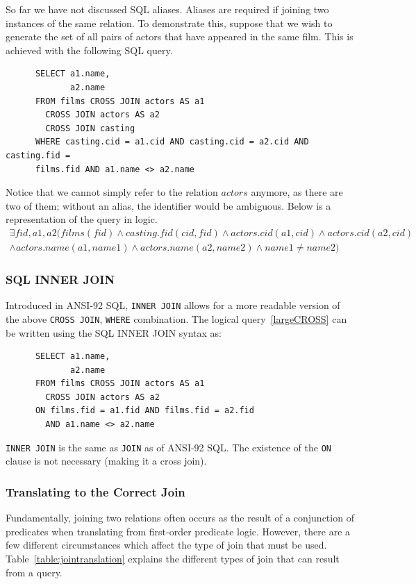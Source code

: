 \documentclass[a4paper, 11pt]{article}
\begin{document}
      So far we have not discussed SQL aliases. Aliases are required if joining
      two instances of the same relation. To demonstrate this, suppose that we
      wish to generate the set of all pairs of actors that have appeared in the
      same film. This is achieved with the following SQL query.
      \begin{verbatim}
      SELECT a1.name,
             a2.name
      FROM films CROSS JOIN actors AS a1
        CROSS JOIN actors AS a2
        CROSS JOIN casting
      WHERE casting.cid = a1.cid AND casting.cid = a2.cid AND casting.fid =
      films.fid AND a1.name <> a2.name
      \end{verbatim}
      Notice that we cannot simply refer to the relation $actors$ anymore, as
      there are two of them; without an alias, the identifier would be
      ambiguous. Below is a representation of the query in logic.
      \begin{multline}
        \label{largeCROSS}
        \exists fid, a1, a2(films(fid) \land casting.fid(cid, fid) \land
          actors.cid(a1, cid) \land actors.cid(a2, cid) \\
        \land actors.name(a1, name1) \land actors.name(a2, name2) \land
          name1 \neq name2)
      \end{multline}

    \subsubsection{SQL INNER JOIN}
      Introduced in ANSI-92 SQL, \texttt{INNER JOIN} allows for a more readable
      version of the above \texttt{CROSS JOIN}, \texttt{WHERE} combination. The
      logical query~\ref{largeCROSS} can be written using the SQL INNER JOIN
      syntax as:
      \begin{verbatim}
      SELECT a1.name,
             a2.name
      FROM films CROSS JOIN actors AS a1
        CROSS JOIN actors AS a2
      ON films.fid = a1.fid AND films.fid = a2.fid
        AND a1.name <> a2.name
      \end{verbatim}
      \texttt{INNER JOIN} is the same as \texttt{JOIN} as of ANSI-92 SQL. The
      existence of the \texttt{ON} clause is not necessary (making it a cross
      join).

    \subsubsection{Translating to the Correct Join}
      Fundamentally, joining two relations often occurs as the result of a
      conjunction of predicates when translating from first-order predicate
      logic. However, there are a few different circumstances which affect the
      type of join that must be used. Table~\ref{table:jointranslation} explains
      the different types of join that can result from a query.
\end{document}
